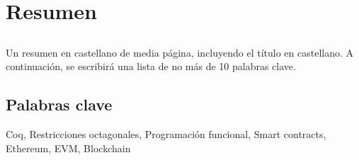 \chapter*{Resumen}

\section*{\tituloPortadaVal}

Un resumen en castellano de media página, incluyendo el título en castellano. A continuación, se escribirá una lista de no más de 10 palabras clave.


\section*{Palabras clave}

\noindent Coq, Restricciones octagonales, Programación funcional, Smart contracts, Ethereum, EVM, Blockchain
